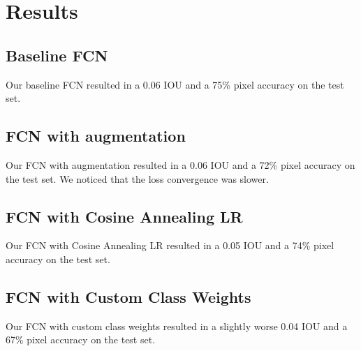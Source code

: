 \section*{Results}


\subsection*{Baseline FCN}

Our baseline FCN resulted in a 0.06 IOU and a 75\% pixel accuracy on the test set.


\subsection*{FCN with augmentation}

Our FCN with augmentation resulted in a 0.06 IOU and a 72\% pixel accuracy on the test set. We noticed that the loss convergence
was slower.

\subsection*{FCN with Cosine Annealing LR}

Our FCN with Cosine Annealing LR resulted in a 0.05 IOU and a 74\% pixel accuracy on the test set.


\subsection*{FCN with Custom Class Weights}


Our FCN with custom class weights resulted in a slightly worse 0.04 IOU and a 67\% pixel accuracy on the test set.



